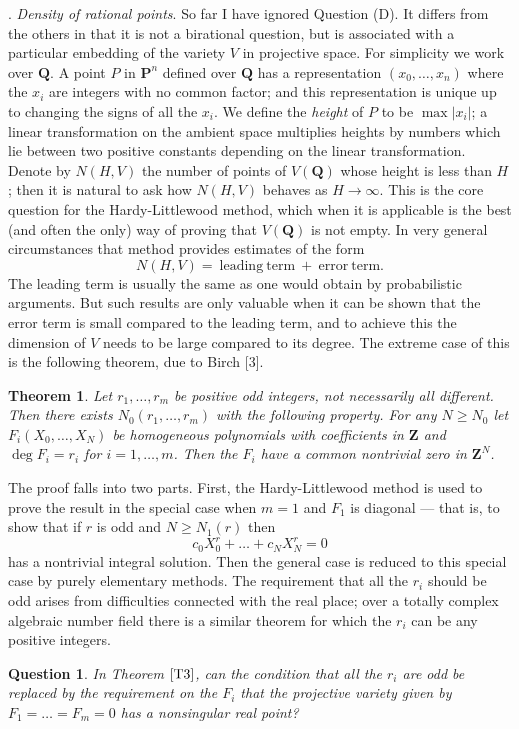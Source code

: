 \documentclass[12pt]{article}
\def\bP{{\mathbf P}}
\def\bQ{{\mathbf Q}}
\def\bZ{{\mathbf Z}}
\def\bpr{\begin{question} \label}
\def\bth{\begin{theorem} \label}
\def\epr{\end{question}}
\def\eth{\end{theorem}}
\newtheorem{theorem}{Theorem}
\newtheorem{question}{Question}
\begin{document}
\bigskip

. \emph{Density of rational points}. \newline
So far I have ignored Question (D). It differs from the others in that it is
not a birational question, but is associated with a particular embedding
of the variety $V$ in
projective space. For simplicity we work over $\bQ$. A point $P$ in $\bP^n$
defined over $\bQ$ has a representation $(x_0,\ldots,x_n)$ where the $x_i$ are
integers with no common factor; and this representation is unique up to
changing the signs of all the $x_i$. We define the \emph{height} of $P$ to be
$\max|x_i|$; a linear transformation on the ambient space multiplies heights
by numbers which lie between two positive constants depending on the linear
transformation. Denote by $N(H,V)$ the number of points of $V(\bQ)$ whose
height is less than $H$; then it is natural to ask how $N(H,V)$ behaves as
$H\rightarrow\infty$.
This is the core question for the Hardy-Littlewood method, which when it is
applicable is the best (and often the only) way of proving that $V(\bQ)$ is
not empty. In very general circumstances that method provides estimates of the
form
\[ N(H,V)={\mathrm{~leading~term~+~error~term}}. \]
The leading term is usually the same as one would obtain by probabilistic
arguments. But such results are only valuable when it can be shown that the
error
term is small compared to the leading term, and to achieve this the dimension
of $V$ needs to be large compared to its degree. The extreme case of this is 
the following theorem, due to Birch [3].
\bth{T3} Let $r_1,\ldots,r_m$ be positive odd integers, not necessarily all
different. Then there exists $N_0(r_1,\ldots,r_m)$ with the following property.
For any $N\geq N_0$ let $F_i(X_0,\ldots,X_N)$ be homogeneous polynomials with
coefficients in $\bZ$ and
$\deg F_i=r_i$ for $i=1,\ldots,m$. Then the $F_i$ have a common nontrivial
zero in $\bZ^N$.
\eth
The proof falls into two parts. First, the Hardy-Littlewood method is used to
prove the result in the special case when $m=1$ and $F_1$ is diagonal ---
that is, to show that if $r$ is odd and $N\geq N_1(r)$ then
\[ c_0X_0^r+\ldots+c_NX_N^r=0 \]
has a nontrivial integral solution. Then the general case is reduced to this
special case by purely elementary methods.
The requirement that all the $r_i$ should be odd arises from difficulties
connected with the real place; over a totally complex algebraic number field
there is a similar theorem for which the $r_i$ can be any positive integers.
\bpr{Q20} In Theorem $\ref{T3}$, can the condition that all the $r_i$ are odd
be replaced by the requirement on the $F_i$ that the projective variety given
by $F_1=\ldots=F_m=0$ has a nonsingular real point?
\epr
\end{document}
